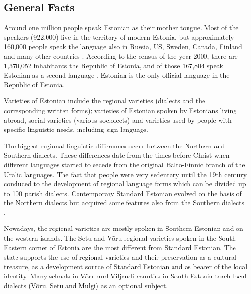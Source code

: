 
\begin{multicols}{2}

\subsection{General Facts}

Around one million people speak Estonian as their mother tongue.  Most of the speakers (922,000) live in the territory of modern Estonia, but approximately 160,000 people speak the language also in Russia, US, Sweden, Canada, Finland and many other countries \cite{Stat1}.  According to the census of the year 2000, there are 1,370,052 inhabitants the Republic of Estonia, and of those 167,804 speak Estonian as a second language \cite{Stat2}.  Estonian is the only official language in the Republic of Estonia.


Varieties of Estonian include the regional varieties (dialects and the corresponding written forms); varieties of Estonian spoken by Estonians living abroad, social varieties (various sociolects) and varieties used by people with specific linguistic needs, including sign language.

The biggest regional linguistic differences occur between the Northern and Southern dialects.  These differences date from the times before Christ when different languages started to secede from the original Balto-Finnic branch of the Uralic languages.  The fact that people were very sedentary until the 19th century conduced to the development of regional language forms which can be divided up to 100 parish dialects.  Contemporary Standard Estonian evolved on the basis of the Northern dialects but acquired some features also from the Southern dialects \cite{KeeleStratEn}.

Nowadays, the regional varieties are mostly spoken in Southern Estonian and on the western islands.  The Setu and Võru regional varieties spoken in the South-Eastern corner of Estonia are the most different from Standard Estonian.  The state supports the use of regional varieties and their preservation as a cultural treasure, as a development source of Standard Estonian and as bearer of the local identity.  Many schools in Võru and Viljandi counties in South Estonia teach local dialects (Võru, Setu and Mulgi) as an optional subject.


\end{multicols}
